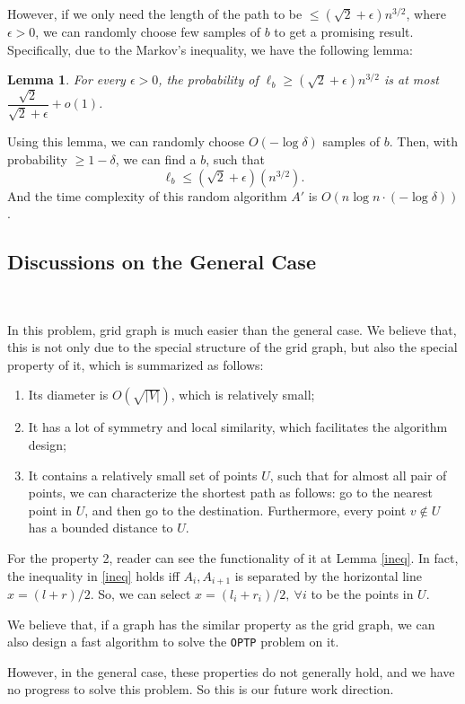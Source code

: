 \documentclass[11pt]{article}
\theoremstyle{plain}
\newtheorem{lemma}{Lemma}[section]
\begin{document}
However, if we only need the length of the path to be $\le (\sqrt{2}+\epsilon)n^{3/2}$, where $\epsilon>0$, we can randomly choose few samples of $b$ to get a promising result. Specifically, due to the Markov's inequality, we have the following lemma:
\begin{lemma}
    \label{lemma5.4}
For every $\epsilon>0$, the probability of $\ell_b\ge (\sqrt{2}+\epsilon)n^{3/2}$ is at most $\dfrac{\sqrt{2}}{\sqrt{2}+\epsilon}+o(1)$.
\end{lemma}
Using this lemma, we can randomly choose $O(-\log \delta)$ samples of $b$. Then, with probability $\ge 1-\delta$, we can find a $b$, such that
$$\ell_b\le (\sqrt{2}+\epsilon)(n^{3/2}).$$
And the time complexity of this random algorithm $A'$ is $O(n\log n\cdot (-\log \delta))$.

\subsection{Discussions on the General Case}\

In this problem, grid graph is much easier than the general case. We believe that, this is not only due to the special structure of the grid graph, but also the special property of it, which is summarized as follows:
\begin{enumerate}
    \item Its diameter is $O(\sqrt{|V|})$, which is relatively small;
    \item It has a lot of symmetry and local similarity, which facilitates the algorithm design;
    \item It contains a relatively small set of points $U$, such that for almost all pair of points, we can characterize the shortest path as follows: go to the nearest point in $U$, and then go to the destination. Furthermore, every point $v\not\in U$ has a bounded distance to $U$.
\end{enumerate}

For the property 2, reader can see the functionality of it at Lemma \ref{ineq}. In fact, the inequality in \ref{ineq} holds iff $A_i,A_{i+1}$ is separated by the horizontal line $x=(l+r)/2$. So, we can select $x=(l_i+r_i)/2,\ \forall i$ to be the points in $U$.

We believe that, if a graph has the similar property as the grid graph, we can also design a fast algorithm to solve the \texttt{OPTP} problem on it.

However, in the general case, these properties do not generally hold, and we have no progress to solve this problem. So this is our future work direction.
\end{document}
